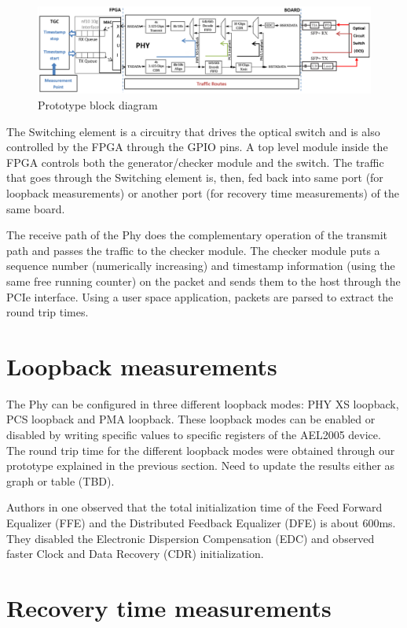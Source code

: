 \documentclass[letterpaper,10pt]{article}
\begin{document}
\begin{figure}[htbp]
  \centering
  \includegraphics[width=15.3cm]{setup}
\caption{Prototype block diagram}
\end{figure}

The Switching element is a circuitry that drives the optical switch and is also controlled by 
the FPGA through the GPIO pins. A top level module inside the FPGA controls both the generator/checker 
module and the switch. The traffic that goes through the Switching element is, then, fed back into 
same port (for loopback measurements) or another port (for recovery time measurements) of the same board.

The receive path of the Phy does the complementary operation of the transmit path and passes the traffic to 
the checker module. The checker module puts a sequence number (numerically increasing) and 
timestamp information (using the same free running counter) on the packet and sends them to the host through
the PCIe interface. Using a user space application, packets are parsed to extract the round trip times.  


\section{Loopback measurements}



The Phy can be configured in three different loopback modes: PHY XS loopback, PCS loopback and PMA loopback. 
These loopback modes can be enabled or disabled by writing specific values to specific registers of the
AEL2005 device. The round trip time for the different loopback modes were obtained through our prototype explained
in the previous section. Need to update the results either as graph or table (TBD).

Authors in one observed that the total initialization time of the Feed Forward Equalizer (FFE) and the 
Distributed Feedback Equalizer (DFE) is about 600ms. They disabled the Electronic Dispersion Compensation (EDC) and
observed faster Clock and Data Recovery (CDR) initialization. 
  

\section{Recovery time measurements}
\end{document}
